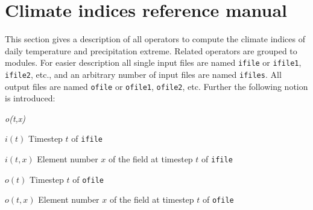 \chapter{\label{refman}Climate indices reference manual}

This section gives a description of all {\CDO} operators to compute the climate indices of daily temperature and precipitation extreme.
Related operators are grouped to modules.
For easier description all single input files are named \texttt{ifile} or \texttt{ifile1}, \texttt{ifile2}, etc.,
and an arbitrary number of input files are named \texttt{ifiles}.
All output files are named \texttt{ofile} or \texttt{ofile1}, \texttt{ofile2}, etc.
Further the following notion is introduced:
\begin{defalist}{{\em o(t,x)}}
\item[\(i(t)\)\hfill]
Timestep \(t\) of \texttt{ifile}
\item[\(i(t,x)\)\hfill]
Element number \(x\) of the field at timestep \(t\) of \texttt{ifile}
\item[\(o(t)\)\hfill]
Timestep \(t\) of \texttt{ofile}
\item[\(o(t,x)\)\hfill]
Element number \(x\) of the field at timestep \(t\) of \texttt{ofile}
\end{defalist}



\hspace{3mm}

%


